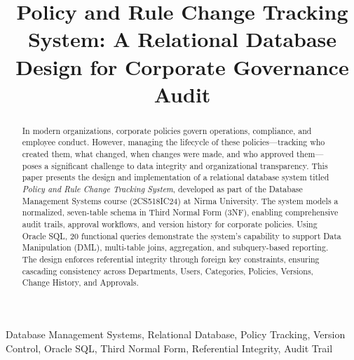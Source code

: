 \documentclass[conference]{IEEEtran}
\begin{document}
\title{Policy and Rule Change Tracking System: A Relational Database Design for Corporate Governance Audit}

\author{
  \and
}

\maketitle

\begin{abstract}
In modern organizations, corporate policies govern operations, compliance, and employee conduct. However, managing the lifecycle of these policies—tracking who created them, what changed, when changes were made, and who approved them—poses a significant challenge to data integrity and organizational transparency. This paper presents the design and implementation of a relational database system titled \textit{Policy and Rule Change Tracking System}, developed as part of the Database Management Systems course (2CS518IC24) at Nirma University. The system models a normalized, seven-table schema in Third Normal Form (3NF), enabling comprehensive audit trails, approval workflows, and version history for corporate policies. Using Oracle SQL, 20 functional queries demonstrate the system's capability to support Data Manipulation (DML), multi-table joins, aggregation, and subquery-based reporting. The design enforces referential integrity through foreign key constraints, ensuring cascading consistency across Departments, Users, Categories, Policies, Versions, Change History, and Approvals.
\end{abstract}

\begin{IEEEkeywords}
Database Management Systems, Relational Database, Policy Tracking, Version Control, Oracle SQL, Third Normal Form, Referential Integrity, Audit Trail
\end{IEEEkeywords}
\end{document}
